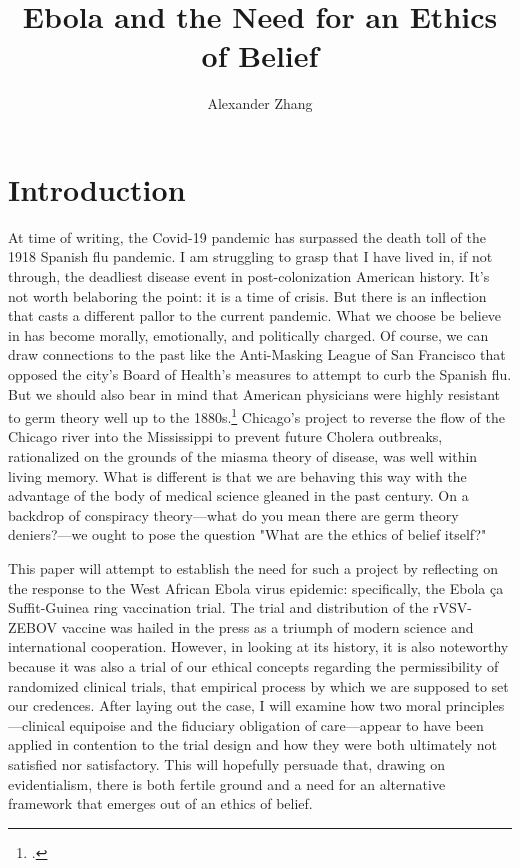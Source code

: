 \documentclass[letterpaper,notitlepage,12pt]{article}
\title{Ebola and the Need for an Ethics of Belief}
\author{Alexander Zhang}
\begin{document}
\maketitle

\section{Introduction}

At time of writing, the Covid-19 pandemic has surpassed the death toll of
the 1918 Spanish flu pandemic.
I am struggling to grasp that I have lived in, if not through, the deadliest
disease event in post-colonization American history.
It's not worth belaboring the point: it is a time of crisis.
But there is an inflection that casts a different pallor to the current
pandemic.
What we choose be believe in has become morally, emotionally, and politically
charged.
Of course, we can draw connections to the past like the Anti-Masking League of
San Francisco that opposed the city's Board of Health's measures to attempt to
curb the Spanish flu.
But we should also bear in mind that American physicians were highly resistant
to germ theory well up to the 1880s.\footcite{Tomes1997}
Chicago's project to reverse the flow of the Chicago river into the Mississippi
to prevent future Cholera outbreaks, rationalized on the grounds of the miasma
theory of disease, was well within living memory.
What is different is that we are behaving this way with the advantage of the
body of medical science gleaned in the past century.
On a backdrop of conspiracy theory---what do you mean there are germ theory
deniers?---we ought to pose the question "What are the ethics of belief itself?"

This paper will attempt to establish the need for such a project by reflecting 
on the response to the West African Ebola virus epidemic: specifically, the 
Ebola \c{c}a Suffit-Guinea ring vaccination trial.
The trial and distribution of the rVSV-ZEBOV vaccine was hailed in the press as
a triumph of modern science and international cooperation.
However, in looking at its history, it is also noteworthy because it was also a
trial of our ethical concepts regarding the permissibility of randomized
clinical trials, that empirical process by which we are supposed to set our
credences.
After laying out the case, I will examine how two moral principles---clinical
equipoise and the fiduciary obligation of care---appear to have been applied in
contention to the trial design and how they were both ultimately not satisfied
nor satisfactory.
This will hopefully persuade that, drawing on evidentialism, there is both
fertile ground and a need for an alternative framework that emerges out of an
ethics of belief.
\end{document}
